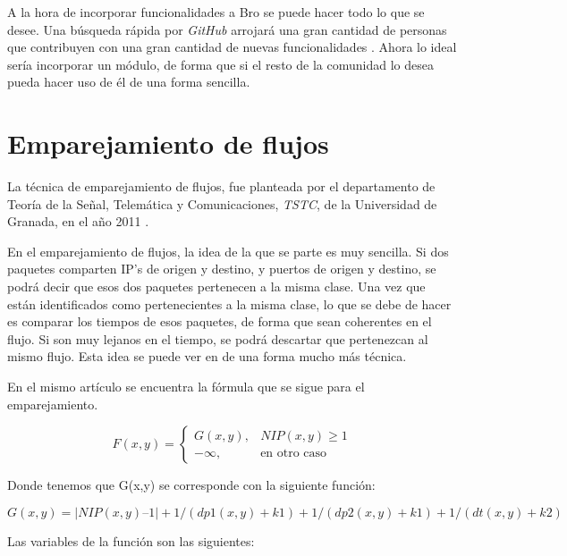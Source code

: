 \intro A la hora de incorporar funcionalidades a Bro se puede hacer todo lo que se desee. Una búsqueda rápida 
por \textit{GitHub} arrojará una gran cantidad de personas que contribuyen con una gran cantidad de nuevas 
funcionalidades \citep{gitbeacon}. Ahora lo ideal sería incorporar un módulo, de forma que si el resto 
de la comunidad lo desea pueda hacer uso de él de una forma sencilla.

\section{Emparejamiento de flujos}

La técnica de emparejamiento de flujos, fue planteada por el departamento de Teoría de la Señal, 
Telemática y Comunicaciones, \textit{TSTC}, de la Universidad de Granada, en el año 2011 \cite{presentacion} \cite{comparacion}. 

\intro En el emparejamiento de flujos, la idea de la que se parte es muy sencilla. Si dos paquetes comparten 
IP's de origen y destino, y puertos de origen y destino, se podrá decir que esos dos paquetes pertenecen a 
la misma clase. Una vez que están identificados como pertenecientes a la misma clase, lo que se debe de hacer 
es comparar los tiempos de esos paquetes, de forma que sean coherentes en el flujo. Si son muy lejanos en el 
tiempo, se podrá descartar que pertenezcan al mismo flujo. Esta idea se puede ver en \cite{comparacion} de una 
forma mucho más técnica.

\intro En el mismo artículo \cite{comparacion} se encuentra la fórmula que se sigue para el emparejamiento.

\begin{equation*}
	F(x,y)=
 	\begin{cases}
	  G(x,y), & NIP(x,y) \geq 1 \\
	  -\infty, & \text{en otro caso}
	 \end{cases}
\end{equation*}

\intro Donde tenemos que G(x,y) se corresponde con la siguiente función:

\begin{displaymath}
G(x,y) = |NIP(x,y) – 1| + 1 / (dp1(x,y) + k1) + 1 / (dp2(x,y) + k1) + 1 / (dt(x,y) + k2)
\end{displaymath}

\intro Las variables de la función son las siguientes: 

